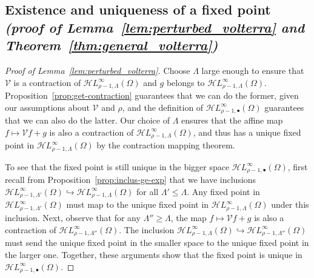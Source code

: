 \documentclass{article}
\theoremstyle{plain}
\newcommand{\singexp}[2]{\mathcal{H}L^\infty_{#1, #2}}
\newcommand{\singexpalg}[1]{\singexp{#1}{\bullet}}
\newcommand{\volterra}{\mathcal{V}}
\begin{document}
\subsection{Existence and uniqueness of a fixed point \\ \textit{(proof of Lemma~\ref{lem:perturbed_volterra} and Theorem~\ref{thm:general_volterra})}}\label{sec:existence and uniqueness}
\begin{proof}[Proof of Lemma~\ref{lem:perturbed_volterra}]
Choose $\Lambda$ large enough to ensure that $\volterra$ is a contraction of $\singexp{\rho-1}{\Lambda}(\Omega)$ and $g$ belongs to $\singexp{\rho-1}{\Lambda}(\Omega)$. Proposition~\ref{prop:get-contraction} guarantees that we can do the former, given our assumptions about $\volterra$ and $\rho$, and the definition of $\singexpalg{\rho-1}(\Omega)$ guarantees that we can also do the latter. Our choice of $\Lambda$ ensures that the affine map $f \mapsto \volterra f + g$ is also a contraction of $\singexp{\rho-1}{\Lambda}(\Omega)$, and thus has a unique fixed point in $\singexp{\rho-1}{\Lambda}(\Omega)$ by the contraction mapping theorem.

To see that the fixed point is still unique in the bigger space $\singexpalg{\rho-1}(\Omega)$, first recall from Proposition~\ref{prop:inclus-ge-exp} that we have inclusions $\singexp{\rho-1}{\Lambda'}(\Omega) \hookrightarrow \singexp{\rho-1}{\Lambda}(\Omega)$ for all $\Lambda' \le \Lambda$. Any fixed point in $\singexp{\rho-1}{\Lambda'}(\Omega)$ must map to the unique fixed point in $\singexp{\rho-1}{\Lambda}(\Omega)$ under this inclusion. Next, observe that for any $\Lambda'' \ge \Lambda$, the map $f \mapsto \volterra f + g$ is also a contraction of $\singexp{\rho-1}{\Lambda''}(\Omega)$. The inclusion $\singexp{\rho-1}{\Lambda}(\Omega) \hookrightarrow \singexp{\rho-1}{\Lambda''}(\Omega)$ must send the unique fixed point in the smaller space to the unique fixed point in the larger one. Together, these arguments show that the fixed point is unique in $\singexpalg{\rho-1}(\Omega)$.
\end{proof}
\end{document}

